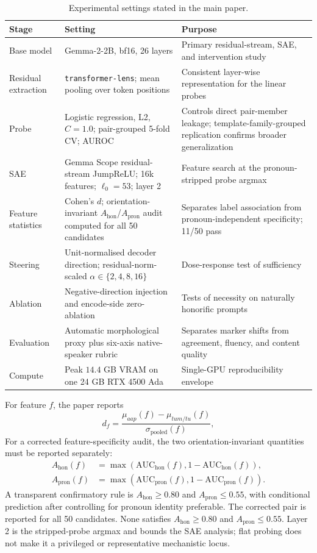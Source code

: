 \documentclass[10pt]{article}
\newcommand{\aap}{\textit{aap}}
\newcommand{\tum}{\textit{tum}}
\newcommand{\tu}{\textit{tu}}
\begin{document}
\begin{table}[H]
\centering
\small
\begin{tabularx}{\textwidth}{p{3.1cm}p{4.0cm}X}
\toprule
\textbf{Stage} & \textbf{Setting} & \textbf{Purpose} \\
\midrule
Base model & Gemma-2-2B, bf16, 26 layers & Primary residual-stream, SAE, and intervention study \\
Residual extraction & \texttt{transformer-lens}; mean pooling over token positions & Consistent layer-wise representation for the linear probes \\
Probe & Logistic regression, L2, $C=1.0$; pair-grouped 5-fold CV; AUROC & Controls direct pair-member leakage; template-family-grouped replication confirms broader generalization \\
SAE & Gemma Scope residual-stream JumpReLU; 16k features; $\ell_0=53$; layer 2 & Feature search at the pronoun-stripped probe argmax \\
Feature statistics & Cohen's $d$; orientation-invariant $A_{\mathrm{hon}}$/$A_{\mathrm{pron}}$ audit computed for all 50 candidates & Separates label association from pronoun-independent specificity; 11/50 pass \\
Steering & Unit-normalised decoder direction; residual-norm-scaled $\alpha\in\{2,4,8,16\}$ & Dose-response test of sufficiency \\
Ablation & Negative-direction injection and encode-side zero-ablation & Tests of necessity on naturally honorific prompts \\
Evaluation & Automatic morphological proxy plus six-axis native-speaker rubric & Separates marker shifts from agreement, fluency, and content quality \\
Compute & Peak $14.4$ GB VRAM on one 24 GB RTX 4500 Ada & Single-GPU reproducibility envelope \\
\bottomrule
\end{tabularx}
\caption{Experimental settings stated in the main paper.}
\label{tab:spec}
\end{table}

For feature $f$, the paper reports
\begin{equation}
d_f=\frac{\mu_{\aap}(f)-\mu_{\tum/\tu}(f)}{\sigma_{\mathrm{pooled}}(f)},
\end{equation}
For a corrected feature-specificity audit, the two orientation-invariant
quantities must be reported separately:
\begin{align}
A_{\mathrm{hon}}(f)&=\max(\mathrm{AUC}_{\mathrm{hon}}(f),1-\mathrm{AUC}_{\mathrm{hon}}(f)),\\
A_{\mathrm{pron}}(f)&=\max(\mathrm{AUC}_{\mathrm{pron}}(f),1-\mathrm{AUC}_{\mathrm{pron}}(f)).
\end{align}
A transparent confirmatory rule is $A_{\mathrm{hon}}\geq0.80$ and
$A_{\mathrm{pron}}\leq0.55$, with conditional prediction after controlling for
pronoun identity preferable. The corrected pair is reported for all 50
candidates. None satisfies $A_{\mathrm{hon}}\geq0.80$ and
$A_{\mathrm{pron}}\leq0.55$. Layer 2 is the stripped-probe argmax and bounds
the SAE analysis; flat probing does not make it a privileged or representative
mechanistic locus.
\FloatBarrier
\end{document}

